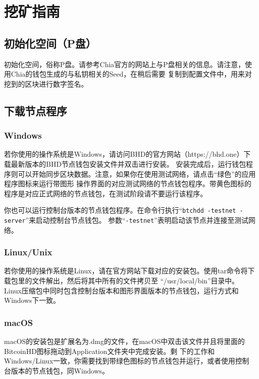 \chapter{挖矿指南}
\section{初始化空间（P盘）}
\begin{flushleft}
    初始化空间，俗称P盘。请参考Chia官方的网站上与P盘相关的信息。请注意，使用Chia的钱包生成的与私钥相关的Seed，在稍后需要
    复制到配置文件中，用来对挖到的区块进行数字签名。
\end{flushleft}
\section{下载节点程序}
\subsection{Windows}
\begin{flushleft}
    若你使用的操作系统是Windows，请访问BHD的官方网站（https://bhd.one）下载最新版本的BHD节点钱包安装文件并双击进行安装。
    安装完成后，运行钱包程序则可以开始同步区块数据。注意，如果你在使用测试网络，请点击``绿色''的应用程序图标来运行带图形
    操作界面的对应测试网络的节点钱包程序。带黄色图标的程序是对应正式网络的节点钱包，在测试阶段请不要运行该程序。
\end{flushleft}
\begin{flushleft}
    你也可以运行控制台版本的节点钱包程序。在命令行执行``\texttt{btchdd -testnet -server}''来启动控制台节点钱包。
    参数``\texttt{-testnet}''表明启动该节点并连接至测试网络。
\end{flushleft}
\subsection{Linux/Unix}
\begin{flushleft}
    若你使用的操作系统是Linux，请在官方网站下载对应的安装包。使用tar命令将下载包里的文件解出，然后将其中所有的文件拷贝至
    ``/usr/local/bin''目录中。Linux压缩包中同时包含控制台版本和图形界面版本的节点钱包，运行方式和Windows下一致。
\end{flushleft}
\subsection{macOS}
\begin{flushleft}
    macOS的安装包是扩展名为.dmg的文件，在macOS中双击该文件并且将里面的BitcoinHD图标拖动到Application文件夹中完成安装。剩
    下的工作和Windows/Linux一致，你需要找到带绿色图标的节点钱包并运行，或者使用控制台版本的节点钱包，同Windows。
\end{flushleft}
